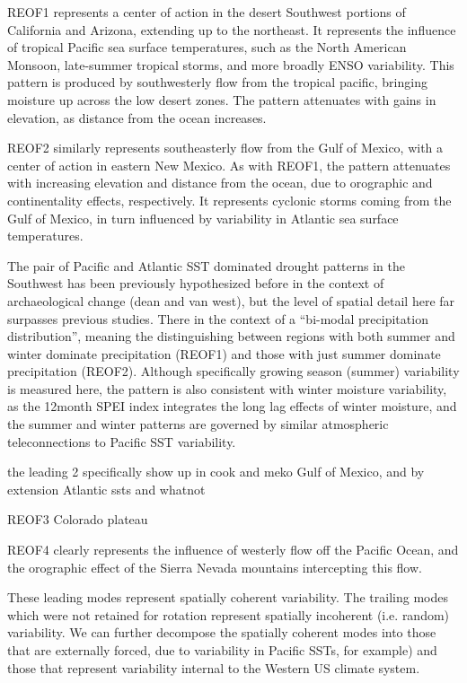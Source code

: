 \documentclass[fleqn,10pt]{wlscirep}
\begin{document}
REOF1 represents a center of action in the desert Southwest portions of California and Arizona, extending up to the northeast. It represents the influence of tropical Pacific sea surface temperatures, such as the North American Monsoon, late-summer tropical storms, and more broadly ENSO variability. This pattern is produced by southwesterly flow from the tropical pacific, bringing moisture up across the low desert zones. The pattern attenuates with gains in elevation, as distance from the ocean increases. 

REOF2 similarly represents southeasterly flow from the Gulf of Mexico, with a center of action in eastern New Mexico. As with REOF1, the pattern attenuates with increasing elevation and distance from the ocean, due to orographic and continentality effects, respectively. It represents cyclonic storms coming from the Gulf of Mexico, in turn influenced by variability in Atlantic sea surface temperatures. 

The pair of Pacific and Atlantic SST dominated drought patterns in the Southwest has been previously hypothesized before in the context of archaeological change (dean and van west), but the level of spatial detail here far surpasses previous studies. There in the context of a ``bi-modal precipitation distribution'', meaning the distinguishing between regions with both summer and winter dominate precipitation (REOF1) and those with just summer dominate precipitation (REOF2). Although specifically growing season (summer) variability is measured here, the pattern is also consistent with winter moisture variability, as the 12month SPEI index integrates the long lag effects of winter moisture, and the summer and winter patterns are governed by similar atmospheric teleconnections to Pacific SST variability.

the leading 2 specifically show up  in cook and meko
Gulf of Mexico, and by extension Atlantic ssts and whatnot

REOF3
Colorado plateau

REOF4 clearly represents the influence of westerly flow off the Pacific Ocean, and the orographic effect of the Sierra Nevada mountains intercepting this flow.

These leading modes represent spatially coherent variability. The trailing modes which were not retained for rotation represent spatially incoherent (i.e. random) variability. We can further decompose the spatially coherent modes into those that are externally forced, due to variability in Pacific SSTs, for example) and those that represent variability internal to the Western US climate system.
\end{document}
